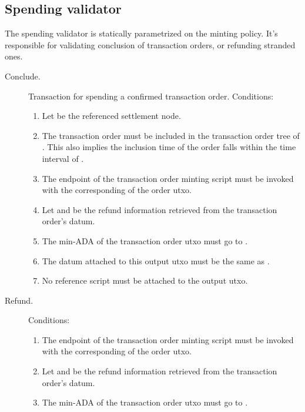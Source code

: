 \documentclass[../midgard.tex]{subfiles}
\begin{document}
\subsection{Spending validator}
\label{h:transaction-order-spending-validator}

The  spending validator is statically parametrized on the  minting policy.
It's responsible for validating conclusion of transaction orders, or refunding stranded ones.

\begin{description}
  \item[Conclude.] Transaction for spending a confirmed transaction order.
    Conditions:
    \begin{enumerate}
      \item Let  be the referenced settlement node.
      \item The transaction order must be included in the transaction order tree of .
        This also implies the inclusion time of the order falls within the time interval of .
      \item The  endpoint of the transaction order minting script must be invoked with the corresponding  of the order utxo.
      \item Let  and  be the refund information retrieved from the transaction order's datum.
      \item The min-ADA of the transaction order utxo must go to .
      \item The datum attached to this output utxo must be the same as .
      \item \todo{} No reference script must be attached to the output utxo.
    \end{enumerate}
  \item[Refund.] 
    Conditions:
    \begin{enumerate}
      \item The  endpoint of the transaction order minting script must be invoked with the corresponding  of the order utxo.
      \item Let  and  be the refund information retrieved from the transaction order's datum.
      \item The min-ADA of the transaction order utxo must go to .

\end{enumerate}
\end{description}
\end{document}
